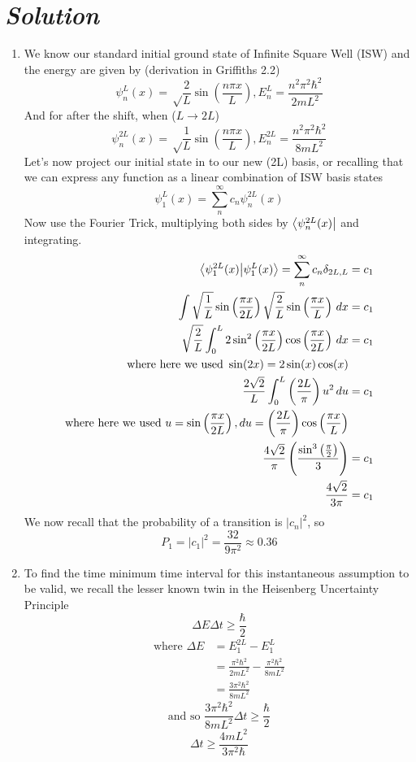 \documentclass{article}
\begin{document}
\section*{\textit{Solution}} 
\begin{enumerate}[label=\alph*)]
	\item We know our standard initial ground state of Infinite Square Well (ISW) and the energy are given by (derivation in Griffiths 2.2)
	\[\psi^L_n(x) = \sqrt\frac{2}{L}\sin\left(\frac{n\pi x}{L}\right), E^L_n = \frac{n^2\pi^2\hbar^2}{2mL^2}\]
	And for after the shift, when ($L \rightarrow 2L$)
	\[ \psi^{2L}_n(x) = \sqrt\frac{1}{L}\sin\left(\frac{n\pi x}{L}\right), E^{2L}_n = \frac{n^2\pi^2\hbar^2}{8mL^2}\]
	Let's now project our initial state in to our new (2L) basis, or recalling that we can express any function as a linear combination of ISW basis states
	\[\psi^L_1(x) = \sum_n^{\infty} c_n \psi^{2L}_n(x) \]
	Now use the Fourier Trick, multiplying both sides by $\bra{\psi^{2L}_n(x)}$ and integrating. 
	\begin{align}		
	\bra{\psi^{2L}_1(x)}\ket{\psi^L_1(x)} = \sum_n^{\infty} c_n \delta_{2L, L} &= c_1 \\
	\int \sqrt\frac{1}{L}\sin\left(\frac{\pi x}{2L}\right)\sqrt\frac{2}{L}\sin\left(\frac{\pi x}{L}\right) \,dx &= c_1 \\
	\sqrt\frac{2}{L} \int_0^L 2\sin^2\left(\frac{\pi x}{2L}\right)\cos\left(\frac{\pi x}{2L}\right)\,dx &= c_1 \\
	\text{where here we used } \sin(2x) = 2\sin(x)\cos(x) \\
	\frac{2\sqrt{2}}{L} \int_0^L \left(\frac{2L}{\pi}\right) u^2 \,du &= c_1 \\
	\text{where here we used } u = \sin\left(\frac{\pi x}{2L}\right), du = \left(\frac{2L}{\pi}\right)\cos\left(\frac{\pi x}{L}\right) \\ 
	\frac{4\sqrt{2}}{\pi}\left( \frac{\sin^3\left(\frac{\pi}{2}\right)}{3} \right) &= c_1 \\
	\frac{4\sqrt{2}}{3\pi} &= c_1
	\end{align}
	We now recall that the probability of a transition is $|c_n|^2$, so
	\[ \boxed{P_1 = |c_1|^2 = \frac{32}{9\pi^2} \approx 0.36 } \]
	\item To find the time minimum time interval for this 
	instantaneous assumption to be valid, we recall the lesser known twin in the Heisenberg Uncertainty Principle
	\[ \Delta E \Delta t \geq \frac{\hbar}{2} \]
	\begin{align}
	\text{where } \Delta E &= E^{2L}_1 - E^L_1 \\ 
	&= \frac{\pi^2\hbar^2}{2mL^2} - \frac{\pi^2\hbar^2}{8mL^2} \\
	&= \frac{3\pi^2\hbar^2}{8mL^2}
	\end{align}
	\[ \text{and so }\frac{3\pi^2\hbar^2}{8mL^2}\Delta t \geq \frac{\hbar}{2} \]
	\[ \boxed{ \Delta t \geq \frac{4mL^2}{3\pi^2\hbar} } \]
\end{enumerate}
\end{document}

